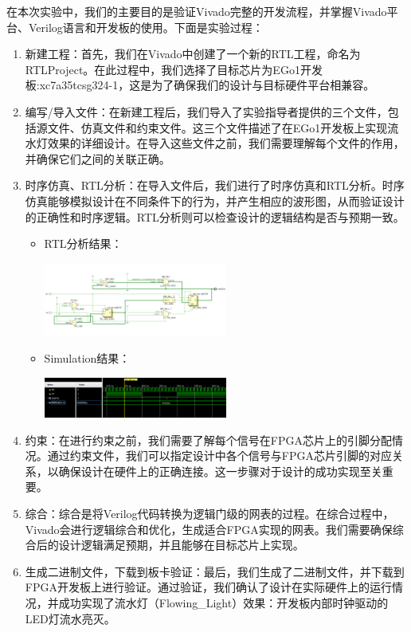 \documentclass[a4,10pt,zihao=-4]{ctexart}
\begin{document}
在本次实验中，我们的主要目的是验证Vivado完整的开发流程，并掌握Vivado平台、Verilog语言和开发板的使用。下面是实验过程：

\begin{enumerate}
\item
  新建工程：首先，我们在Vivado中创建了一个新的RTL工程，命名为RTLProject。在此过程中，我们选择了目标芯片为EGo1开发板:xc7a35tcsg324-1，这是为了确保我们的设计与目标硬件平台相兼容。
\item
  编写/导入文件：在新建工程后，我们导入了实验指导者提供的三个文件，包括源文件、仿真文件和约束文件。这三个文件描述了在EGo1开发板上实现流水灯效果的详细设计。在导入这些文件之前，我们需要理解每个文件的作用，并确保它们之间的关联正确。
\item
  时序仿真、RTL分析：在导入文件后，我们进行了时序仿真和RTL分析。时序仿真能够模拟设计在不同条件下的行为，并产生相应的波形图，从而验证设计的正确性和时序逻辑。RTL分析则可以检查设计的逻辑结构是否与预期一致。
    \begin{itemize}
    \item RTL分析结果：
      
      \includegraphics[width=0.5\textwidth]{Flowing_light_RTL.png}
    \item Simulation结果：
      
      \includegraphics[width=0.5\textwidth]{Flowing_light_Simulation.png}
    \end{itemize}
\item
  约束：在进行约束之前，我们需要了解每个信号在FPGA芯片上的引脚分配情况。通过约束文件，我们可以指定设计中各个信号与FPGA芯片引脚的对应关系，以确保设计在硬件上的正确连接。这一步骤对于设计的成功实现至关重要。
\item
  综合：综合是将Verilog代码转换为逻辑门级的网表的过程。在综合过程中，Vivado会进行逻辑综合和优化，生成适合FPGA实现的网表。我们需要确保综合后的设计逻辑满足预期，并且能够在目标芯片上实现。
\item
  生成二进制文件，下载到板卡验证：最后，我们生成了二进制文件，并下载到FPGA开发板上进行验证。通过验证，我们确认了设计在实际硬件上的运行情况，并成功实现了流水灯（Flowing\_Light）效果：开发板内部时钟驱动的LED灯流水亮灭。


\end{enumerate}
\end{document}
